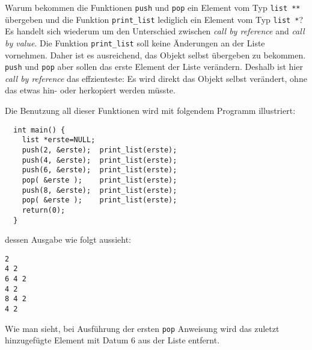 Warum bekommen die Funktionen \verb|push| und \verb|pop| ein Element vom Typ \verb|list **| übergeben und die Funktion \verb|print_list| lediglich ein Element vom Typ \verb|list *|?
Es handelt sich wiederum um den Unterschied zwischen \emph{call by reference} and \emph{call by value}.
Die Funktion \verb|print_list| soll keine Änderungen an der Liste vornehmen.
Daher ist es ausreichend, das Objekt selbst übergeben zu bekommen.
\verb|push| und \verb|pop| aber sollen das erste Element der Liste verändern.
Deshalb ist hier \emph{call by reference} das effzienteste: Es wird direkt das Objekt selbst verändert, ohne das etwas hin- oder herkopiert werden müsste.

Die Benutzung all dieser Funktionen wird mit folgendem Programm illustriert:
\begin{lstlisting}
  int main() {
    list *erste=NULL;
    push(2, &erste);  print_list(erste);
    push(4, &erste);  print_list(erste);
    push(6, &erste);  print_list(erste);
    pop( &erste );    print_list(erste);
    push(8, &erste);  print_list(erste);
    pop( &erste );    print_list(erste);
    return(0);
  }
\end{lstlisting}
dessen Ausgabe wie folgt aussieht:
\begin{verbatim}
2	
4 2
6 4 2	
4 2
8 4 2	
4 2
\end{verbatim}
Wie man sieht, bei Ausführung der ersten \texttt{pop} Anweisung wird das zuletzt hinzugefügte Element mit Datum $6$ aus der Liste entfernt.

\endinput

